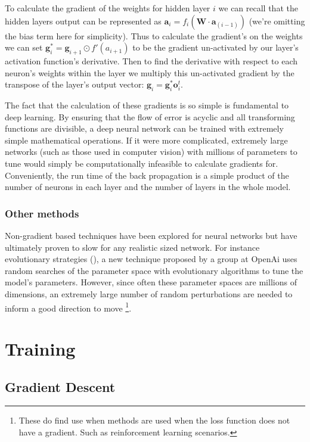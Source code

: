 \documentclass[]{book}
\let\rmarkdownfootnote\footnote%
\def\footnote{\protect\rmarkdownfootnote}
\theoremstyle{definition}
\theoremstyle{definition}
\theoremstyle{definition}
\theoremstyle{remark}
\begin{document}
To calculate the gradient of the weights for hidden layer \(i\) we can
recall that the hidden layers output can be represented as
\(\textbf{a}_i = f_i(\textbf{W}\cdot\textbf{a}_{(i -1)})\) (we're
omitting the bias term here for simplicity). Thus to calculate the
gradient's on the weights we can set
\(\textbf{g}^*_i = \textbf{g}_{i+1} \odot f'(a_{i+1})\) to be the
gradient un-activated by our layer's activation function's derivative.
Then to find the derivative with respect to each neuron's weights within
the layer we multiply this un-activated gradient by the transpose of the
layer's output vector: \(\textbf{g}_i = \textbf{g}^*_i \textbf{o}_i^t\).

The fact that the calculation of these gradients is so simple is
fundamental to deep learning. By ensuring that the flow of error is
acyclic and all transforming functions are divisible, a deep neural
network can be trained with extremely simple mathematical operations. If
it were more complicated, extremely large networks (such as those used
in computer vision) with millions of parameters to tune would simply be
computationally infeasible to calculate gradients for. Conveniently, the
run time of the back propagation is a simple product of the number of
neurons in each layer and the number of layers in the whole model.

\subsubsection{Other methods}\label{other-methods}

Non-gradient based techniques have been explored for neural networks but
have ultimately proven to slow for any realistic sized network. For
instance evolutionary strategies (\citet{evostrat}), a new technique
proposed by a group at OpenAi uses random searches of the parameter
space with evolutionary algorithms to tune the model's parameters.
However, since often these parameter spaces are millions of dimensions,
an extremely large number of random perturbations are needed to inform a
good direction to move \footnote{These do find use when methods are used
  when the loss function does not have a gradient. Such as reinforcement
  learning scenarios.}.

\section{Training}\label{training}

\subsection{Gradient Descent}\label{gradient-descent}
\end{document}
